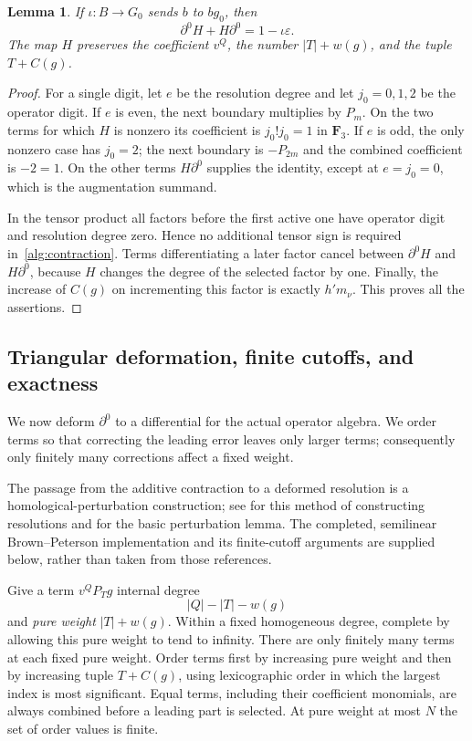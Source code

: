 \documentclass[11pt]{article}
\newtheorem{lemma}[theorem]{Lemma}
\theoremstyle{definition}
\theoremstyle{remark}
\numberwithin{equation}{section}
\begin{document}
\begin{lemma}\label{alg:additive-contraction}
If $\iota:B\to G_0$ sends $b$ to $bg_0$, then
\[
 \partial^0H+H\partial^0=1-\iota\varepsilon.
\]
The map $H$ preserves the coefficient $v^Q$, the number
$|T|+w(g)$, and the tuple $T+C(g)$.
\end{lemma}

\begin{proof}
For a single digit, let $e$ be the resolution degree and let
$j_0=0,1,2$ be the operator digit.  If $e$ is even, the next boundary
multiplies by $P_m$.  On the two terms for which $H$ is nonzero its
coefficient is $j_0!j_0=1$ in $\mathbf F_3$.  If $e$ is odd, the only nonzero
case has $j_0=2$; the next boundary is $-P_{2m}$ and the combined
coefficient is $-2=1$.  On the other terms $H\partial^0$ supplies the
identity, except at $e=j_0=0$, which is the augmentation summand.

In the tensor product all factors before the first active one have
operator digit and resolution degree zero.  Hence no additional tensor
sign is required in~\eqref{alg:contraction}.  Terms differentiating a
later factor cancel between $\partial^0H$ and $H\partial^0$, because
$H$ changes the degree of the selected factor by one.  Finally, the
increase of $C(g)$ on incrementing this factor is exactly $h'm_\nu$.
This proves all the assertions.
\end{proof}

\subsection{Triangular deformation, finite cutoffs, and exactness}

We now deform $\partial^0$ to a differential for the actual operator
algebra. We order terms so that correcting the leading error leaves only
larger terms; consequently only finitely many corrections affect a fixed
weight.

The passage from the additive contraction to a deformed resolution is
a homological-perturbation construction; see \cite{Lambe1991} for this
method of constructing resolutions and
\cite[Section~4.8.3, Theorem~51]{RubioSergeraert2013} for the basic
perturbation lemma.  The completed, semilinear Brown--Peterson
implementation and its finite-cutoff arguments are supplied below,
rather than taken from those references.

Give a term $v^QP_Tg$ internal degree
\begin{equation}\label{alg:dual-degree}
 |Q|-|T|-w(g)
\end{equation}
and \emph{pure weight} $|T|+w(g)$.  Within a fixed homogeneous degree,
complete by allowing this pure weight to tend to infinity.  There are
only finitely many terms at each fixed pure weight.  Order terms first
by increasing pure weight and then by increasing tuple $T+C(g)$,
using lexicographic order in which the largest index is most significant.
Equal terms, including their coefficient monomials, are always combined
before a leading part is selected.  At pure weight at most $N$ the set
of order values is finite.
\end{document}
